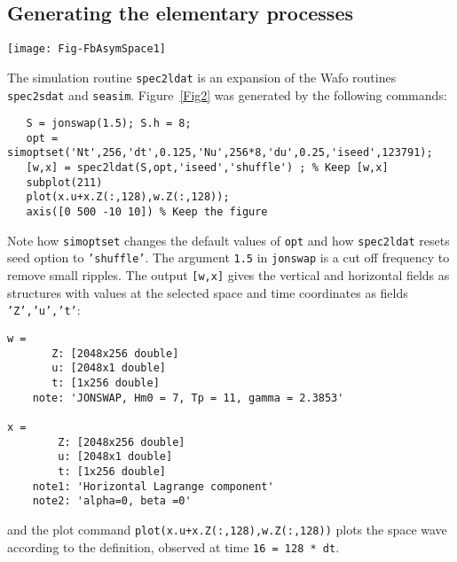 \subsection{Generating  the elementary processes}
\begin{SCfigure}[1][t]
\texttt{[image: Fig-FbAsymSpace1]}
\caption{Front-back symmetric Lagrange space wave on shallow water {\tt (h = 8 m)}; direct plot.}
\label{Fig2}
\end{SCfigure}
The simulation routine {\tt spec2ldat} is an expansion of the {\sc Wafo} routines {\tt spec2sdat} and {\tt seasim}. Figure~\ref{Fig2} was generated by the following commands:
{\small\begin{verbatim}
   S = jonswap(1.5); S.h = 8;
   opt = simoptset('Nt',256,'dt',0.125,'Nu',256*8,'du',0.25,'iseed',123791);
   [w,x] = spec2ldat(S,opt,'iseed','shuffle') ; % Keep [w,x]
   subplot(211)
   plot(x.u+x.Z(:,128),w.Z(:,128));
   axis([0 500 -10 10]) % Keep the figure
\end{verbatim}
}
Note how {\tt simoptset} changes the default values of {\tt opt} and how  {\tt spec2ldat} resets seed option to {\tt 'shuffle'}.  The argument {\tt 1.5} in {\tt jonswap} is a cut off frequency to remove small ripples. The output {\tt [w,x]} gives the vertical and horizontal fields as structures with values at the selected space and time coordinates as fields {\tt 'Z','u','t'}:
{\small\begin{verbatim}
w =
       Z: [2048x256 double]
       u: [2048x1 double]
       t: [1x256 double]
    note: 'JONSWAP, Hm0 = 7, Tp = 11, gamma = 2.3853'

x =
        Z: [2048x256 double]
        u: [2048x1 double]
        t: [1x256 double]
    note1: 'Horizontal Lagrange component'
    note2: 'alpha=0, beta =0'
\end{verbatim}}
\noindent and the plot command  {\tt plot(x.u+x.Z(:,128),w.Z(:,128))} plots the space wave according to the definition, 
observed at time {\tt 16 = 128 * dt}.

